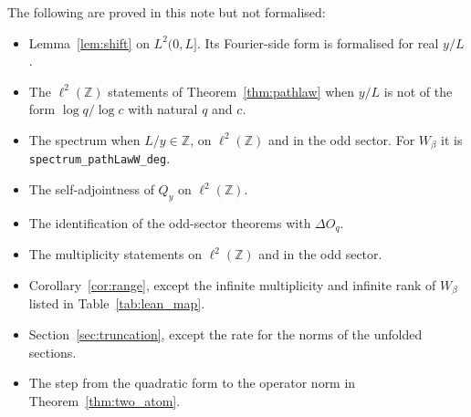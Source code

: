\documentclass[11pt,a4paper]{article}
\theoremstyle{plain}
\theoremstyle{definition}
\theoremstyle{remark}
\newcommand{\Z}{\mathbb{Z}}
\begin{document}
The following are proved in this note but not formalised:
\begin{itemize}[leftmargin=1.8em]
  \item Lemma~\ref{lem:shift} on $L^2(0,L]$. Its Fourier-side form is formalised for real $y/L$.
  \item The $\ell^2(\Z)$ statements of Theorem~\ref{thm:pathlaw} when $y/L$ is not of the form $\log q/\log c$ with natural $q$ and $c$.
  \item The spectrum when $L/y \in \Z$, on $\ell^2(\Z)$ and in the odd sector. For $W_\beta$ it is \texttt{spectrum\_\allowbreak pathLawW\_\allowbreak deg}.
  \item The self-adjointness of $Q_y$ on $\ell^2(\Z)$.
  \item The identification of the odd-sector theorems with $\Delta O_q$.
  \item The multiplicity statements on $\ell^2(\Z)$ and in the odd sector.
  \item Corollary~\ref{cor:range}, except the infinite multiplicity and infinite rank of $W_\beta$ listed in Table~\ref{tab:lean_map}.
  \item Section~\ref{sec:truncation}, except the rate for the norms of the unfolded sections.
  \item The step from the quadratic form to the operator norm in Theorem~\ref{thm:two_atom}.
\end{itemize}
\end{document}

